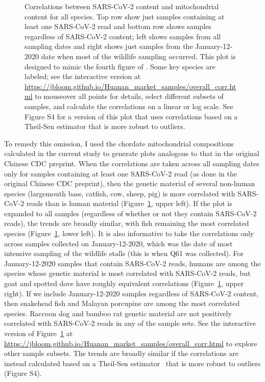 \documentclass[9pt,twocolumn,twoside]{gsajnl_modified}
\begin{document}
\begin{figure}
\caption{
Correlations between SARS-CoV-2 content and mitochondrial content for all species.
Top row show just samples containing at least one SARS-CoV-2 read and bottom row shows samples regardless of SARS-CoV-2 content; left shows samples from all sampling dates and right shows just samples from the January-12-2020 date when most of the wildlife sampling occurred.
This plot is designed to mimic the fourth figure of \citet{liu2022surveillance}.
Some key species are labeled; see the interactive version at \url{https://jbloom.github.io/Huanan_market_samples/overall_corr.html} to mouseover all points for details, select different subsets of samples, and calculate the correlations on a linear or log scale.
See Figure S4 for a version of this plot that uses correlations based on a Theil-Sen estimator that is more robust to outliers.
\label{fig:overall_corr}
}
\end{figure}

To remedy this omission, I used the chordate mitochondrial compositions calculated in the current study to generate plots analogous to that in the original Chinese CDC preprint.
When the correlations are taken across all sampling dates only for samples containing at least one SARS-CoV-2 read (as done in the original Chinese CDC preprint), then the genetic material of several non-human species (largemouth bass, catfish, cow, sheep, pig) is more correlated with SARS-CoV-2 reads than is human material (Figure~\ref{fig:overall_corr}, upper left).
If the plot is expanded to all samples (regardless of whether or not they contain SARS-CoV-2 reads), the trends are broadly similar, with fish remaining the most correlated species (Figure~\ref{fig:overall_corr}, lower left).
It is also informative to take the correlations only across samples collected on January-12-2020, which was the date of most intensive sampling of the wildlife stalls (this is when Q61 was collected).
 For January-12-2020 samples that contain SARS-CoV-2 reads, humans are among the species whose genetic material is most correlated with SARS-CoV-2 reads, but goat and spotted dove have roughly equivalent correlations (Figure~\ref{fig:overall_corr}, upper right).
 If we include January-12-2020 samples regardless of SARS-CoV-2 content, then snakehead fish and Malayan porcupine are among the most correlated species.
Raccoon dog and bamboo rat genetic material are not positively correlated with SARS-CoV-2 reads in any of the sample sets.
See the interactive version of Figure~\ref{fig:overall_corr} at \url{https://jbloom.github.io/Huanan_market_samples/overall_corr.html} to explore other sample subsets.
The trends are broadly similar if the correlations are instead calculated based on a Theil-Sen estimator~\citep{theilsen} that is more robust to outliers (Figure S4).
\end{document}
